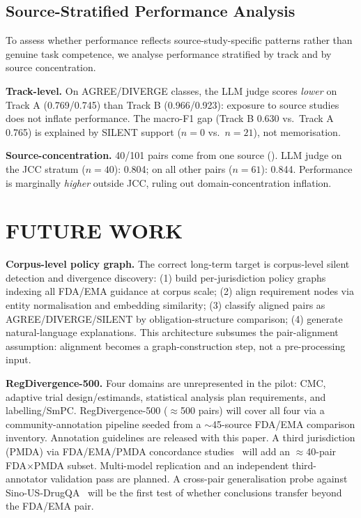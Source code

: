 \documentclass[manuscript]{acmart}
\makeatletter
\let\@acmt@@section\section
\renewcommand{\section}[1]{%
  \@acmt@@section{\texorpdfstring{\MakeUppercase{#1}}{#1}}}
\makeatother
\begin{document}
\subsection{Source-Stratified Performance Analysis}
\label{sec:source_stratified}

To assess whether performance reflects source-study-specific patterns rather
than genuine task competence, we analyse performance stratified by track and
by source concentration.

\textbf{Track-level.} On AGREE/DIVERGE classes, the LLM judge scores
\textit{lower} on Track A (0.769/0.745) than Track B (0.966/0.923): exposure
to source studies does not inflate performance. The macro-F1 gap (Track B 0.630
vs.\ Track A 0.765) is explained by SILENT support ($n = 0$ vs.\ $n = 21$),
not memorisation.

\textbf{Source-concentration.} 40/101 pairs come from one source
(\citeauthor{uc2025jcc}). LLM judge on the JCC stratum ($n = 40$): 0.804;
on all other pairs ($n = 61$): 0.844. Performance is marginally
\textit{higher} outside JCC, ruling out domain-concentration inflation.

\section{Future Work}
\label{sec:futurework}

\textbf{Corpus-level policy graph.}
The correct long-term target is corpus-level silent detection and divergence
discovery: (1) build per-jurisdiction policy graphs indexing all FDA/EMA
guidance at corpus scale; (2) align requirement nodes via entity normalisation
and embedding similarity; (3) classify aligned pairs as AGREE/DIVERGE/SILENT by
obligation-structure comparison; (4) generate natural-language explanations.
This architecture subsumes the pair-alignment assumption: alignment becomes a
graph-construction step, not a pre-processing input.

\textbf{RegDivergence-500.}
Four domains are unrepresented in the pilot: CMC, adaptive trial design/estimands,
statistical analysis plan requirements, and labelling/SmPC. RegDivergence-500
($\approx$500 pairs) will cover all four via a community-annotation pipeline
seeded from a $\sim$45-source FDA/EMA comparison inventory.
Annotation guidelines are released with this paper. A third jurisdiction (PMDA)
via FDA/EMA/PMDA concordance studies~\cite{mita2026doses,gomezfernandez2026inhibitors}
will add an $\approx$40-pair FDA$\times$PMDA subset. Multi-model replication and
an independent third-annotator validation pass are planned.
A cross-pair generalisation probe against Sino-US-DrugQA~\cite{sinousdrugqa2026}
will be the first test of whether conclusions transfer beyond the FDA/EMA pair.
\end{document}
